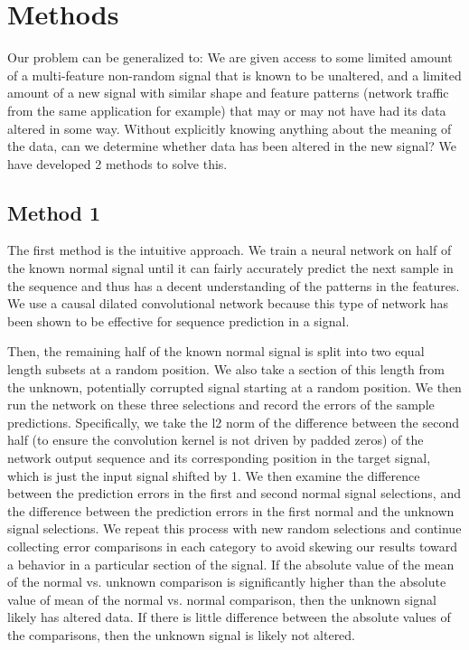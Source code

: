 \documentclass{acm_proc_article-sp}
\begin{document}
  \section{Methods}
  \label{sec:methods}

  Our problem can be generalized to: We are given access to some limited amount of a multi-feature non-random signal that is known to be unaltered, and a limited amount of a new signal with similar shape and feature patterns (network traffic from the same application for example) that may or may not have had its data altered in some way. Without explicitly knowing anything about the meaning of the data, can we determine whether data has been altered in the new signal? We have developed 2 methods to solve this.

  \subsection{Method 1}
  \label{subsec:method1}

  The first method is the intuitive approach. We train a neural network on half of the known normal signal until it can fairly accurately predict the next sample in the sequence and thus has a decent understanding of the patterns in the features. We use a causal dilated convolutional network because this type of network has been shown to be effective for sequence prediction in a signal.
  
  Then, the remaining half of the known normal signal is split into two equal length subsets at a random position. We also take a section of this length from the unknown, potentially corrupted signal starting at a random position. We then run the network on these three selections and record the errors of the sample predictions. Specifically, we take the l2 norm of the difference between the second half (to ensure the convolution kernel is not driven by padded zeros) of the network output sequence and its corresponding position in the target signal, which is just the input signal shifted by 1. We then examine the difference between the prediction errors in the first and second normal signal selections, and the difference between the prediction errors in the first normal and the unknown signal selections.  We repeat this process with new random selections and continue collecting error comparisons in each category to avoid skewing our results toward a behavior in a particular section of the signal. If the absolute value of the mean of the normal vs. unknown comparison is significantly higher than the absolute value of mean of the normal vs. normal comparison, then the unknown signal likely has altered data. If there is little difference between the absolute values of the comparisons, then the unknown signal is likely not altered.
\end{document}

